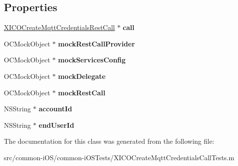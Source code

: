 \subsection*{Properties}
\begin{DoxyCompactItemize}
\item 
\hypertarget{interface_x_i_c_o_create_mqtt_credentials_call_tests_af42e61f66a62e8a8dc289523485b07e7}{}\label{interface_x_i_c_o_create_mqtt_credentials_call_tests_af42e61f66a62e8a8dc289523485b07e7} 
\hyperlink{interface_x_i_c_o_create_mqtt_credentials_rest_call}{X\+I\+C\+O\+Create\+Mqtt\+Credentials\+Rest\+Call} $\ast$ {\bfseries call}
\item 
\hypertarget{interface_x_i_c_o_create_mqtt_credentials_call_tests_a464b27169bda8eefca1d00d52c87eaed}{}\label{interface_x_i_c_o_create_mqtt_credentials_call_tests_a464b27169bda8eefca1d00d52c87eaed} 
O\+C\+Mock\+Object $\ast$ {\bfseries mock\+Rest\+Call\+Provider}
\item 
\hypertarget{interface_x_i_c_o_create_mqtt_credentials_call_tests_ae5a08129ff2bab098697e2c2a6794390}{}\label{interface_x_i_c_o_create_mqtt_credentials_call_tests_ae5a08129ff2bab098697e2c2a6794390} 
O\+C\+Mock\+Object $\ast$ {\bfseries mock\+Services\+Config}
\item 
\hypertarget{interface_x_i_c_o_create_mqtt_credentials_call_tests_ac68fd089c11eb34da61f5d470f20ae0e}{}\label{interface_x_i_c_o_create_mqtt_credentials_call_tests_ac68fd089c11eb34da61f5d470f20ae0e} 
O\+C\+Mock\+Object $\ast$ {\bfseries mock\+Delegate}
\item 
\hypertarget{interface_x_i_c_o_create_mqtt_credentials_call_tests_ac04bbd24010791db8dbfe0c1428f93b2}{}\label{interface_x_i_c_o_create_mqtt_credentials_call_tests_ac04bbd24010791db8dbfe0c1428f93b2} 
O\+C\+Mock\+Object $\ast$ {\bfseries mock\+Rest\+Call}
\item 
\hypertarget{interface_x_i_c_o_create_mqtt_credentials_call_tests_a3711b472f3ebfac98113b4f944a311f7}{}\label{interface_x_i_c_o_create_mqtt_credentials_call_tests_a3711b472f3ebfac98113b4f944a311f7} 
N\+S\+String $\ast$ {\bfseries account\+Id}
\item 
\hypertarget{interface_x_i_c_o_create_mqtt_credentials_call_tests_ab06682f44cd817736358489a6f4d00bd}{}\label{interface_x_i_c_o_create_mqtt_credentials_call_tests_ab06682f44cd817736358489a6f4d00bd} 
N\+S\+String $\ast$ {\bfseries end\+User\+Id}
\end{DoxyCompactItemize}


The documentation for this class was generated from the following file\+:\begin{DoxyCompactItemize}
\item 
src/common-\/i\+O\+S/common-\/i\+O\+S\+Tests/X\+I\+C\+O\+Create\+Mqtt\+Credentials\+Call\+Tests.\+m\end{DoxyCompactItemize}
